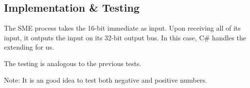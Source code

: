 \documentclass{beamer}
\begin{document}
\subsection{Implementation \& Testing}
\begin{frame}
    The SME process takes the 16-bit immediate as input. Upon receiving all of
    its input, it outputs the input on its 32-bit output bus. In this case, C\#
    handles the extending for us.

    \vspace{\baselineskip}
    The testing is analogous to the previous tests.

    \vspace{\baselineskip}
    Note: It is an good idea to test both negative and positive numbers.
\end{frame}
\end{document}
